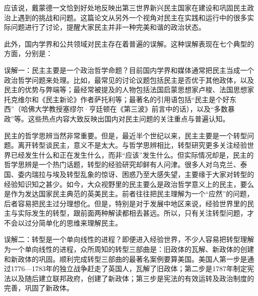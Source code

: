 
应该说，戴蒙德一文恰到好处地反映出第三世界新兴民主国家在建设和巩固民主政治上遇到的挑战和问题。这篇论文从另外一个视角对民主在实践和运行中的很多实际问题进行了讨论，提醒大家民主并非一种完美和谐的政治状态。

此外，国内学界和公共领域对民主存在着普遍的误解。这种误解表现在七个典型的方面，分别是：

误解一：民主主要是一个政治哲学命题？目前国内学界和媒体通常把民主当成一个政治哲学问题来处理。比如，最常见的讨论议题包括民主是否优于其他政体，以及民主的优势与弊端等；最经常被提及的人物包括法国启蒙思想家卢梭、法国思想家托克维尔和《民主新论》作者萨托利等；最著名的引用语包括“民主是个好东西”（哈佛大学教授塞缪尔·亨廷顿在《第三波》前言中的话），以及“多数暴政”等。这些热点内容大致反映出国内对民主问题的关注重点与普遍认知。

民主的哲学思辨当然非常重要。但是，最近半个世纪以来，民主主要是一个转型问题。离开转型谈民主，意义不是太大。与哲学思辨相比，转型研究更多关注经验世界已经发生什么和正在发生什么，而非“应该”发生什么。但实际情况却是，民主的哲学思辨是一个热门话题，转型的经验研究却鲜有人问津。很多人对乌克兰、泰国、委内瑞拉与埃及转型乱象的惊讶、困惑乃至大感失望，主要缘于大家对转型的经验知识知之甚少。如今，大众视野里的民主要么是政治哲学意义上的民主，要么是作为发达国家民主典范的英美民主。前者往往把民主理解为一个“应然”的问题，后者容易把民主过分理想化。但是，特别是对于发展中地区来说，经验世界里的民主与实际发生的转型，跟前面两种解读都相去甚远。所以，只有关注转型问题，才不会以过分简单化的思维来理解民主。

误解二：转型是一个单向线性的进程？即便进入经验世界，不少人容易把转型理解为一个单向线性的进程，众所周知的转型三部曲是：旧政体的瓦解、新政体的创建和新政体的巩固。顺利完成转型三部曲的最著名案例要算美国。美国人第一步是通过1776—1783年的独立战争赶走了英国人，瓦解了旧政体；第二步是1787年制定宪法以及随后建立联邦政府，创建了新政体；第三步是宪法的有效运转及政治制度的完善，巩固了新政体。

